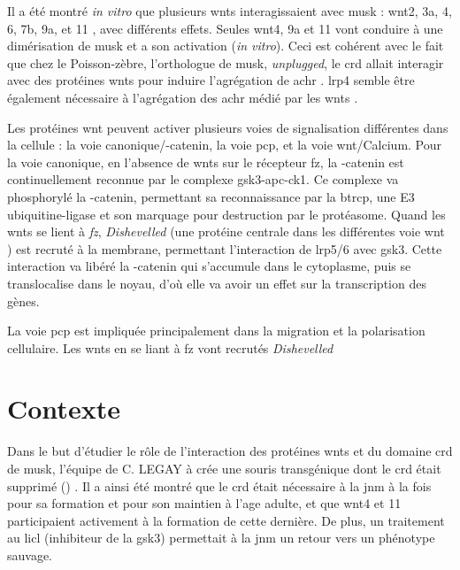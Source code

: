 	Il a été montré \emph{in vitro} que plusieurs \Glspl{wnt} interagissaient avec \gls{musk} : \Gls{wnt}2, 3a, 4, 6, 7b, 9a, et 11 \cite{Strochlic2012, Zhang2012, Barik2014}, avec différents effets. Seules \gls{wnt}4, 9a et 11 vont conduire à une dimérisation de \gls{musk} et a son activation (\emph{in vitro}). Ceci est cohérent avec le fait que chez le Poisson-zèbre, l'orthologue de \gls{musk}, \emph{unplugged}, le \gls{crd} allait interagir avec des protéines \Glspl{wnt} pour induire l'agrégation de \gls{achr} \cite{Jing2009, Gordon2012}. \Gls{lrp}4 semble être également nécessaire à l'agrégation des \gls{achr} médié par les \gls{wnt}s \cite{Zhang2012}.
	
	Les protéines \gls{wnt} peuvent activer plusieurs voies de signalisation différentes dans la cellule :  la voie canonique/\textbeta{}-catenin, la voie \gls{pcp}, et la voie \gls{wnt}/Calcium. Pour la voie canonique, en l'absence de \Glspl{wnt} sur le récepteur \gls{fz}, la \textbeta{}-catenin est continuellement reconnue par le complexe \acrshort{gsk3}-\acrshort{apc}-\acrshort{ck1}. Ce complexe va phosphorylé la \textbeta{}-catenin, permettant sa reconnaissance par la \gls{btrcp}, une E3 ubiquitine-ligase et son marquage pour destruction par le protéasome. Quand les \Glspl{wnt} se lient à \emph{\gls{fz}}, \emph{Dishevelled} (une protéine centrale dans les différentes voie \gls{wnt} \cite{Gao2010}) est recruté à la membrane, permettant l'interaction de \gls{lrp}5/6 avec \gls{gsk3}. Cette interaction va libéré la \textbeta{}-catenin qui s'accumule dans le cytoplasme, puis se translocalise dans le noyau, d'où elle va avoir un effet sur la transcription des gènes. 
	
	La voie \gls{pcp} est impliquée principalement dans la migration et la polarisation cellulaire. Les \Glspl{wnt} en se liant à \gls{fz} vont recrutés \emph{Dishevelled} 

	
\section{Contexte}
	\label{sec:Contexte}
	
	Dans le but d'étudier le rôle de l'interaction des protéines \Glspl{wnt} et du domaine \gls{crd} de \gls{musk}, l'équipe de C. LEGAY à crée une souris transgénique dont le \gls{crd} était supprimé (\mcrd) \cite{Messeant2015, Messeant2017}. Il a ainsi été montré que le \gls{crd} était nécessaire à la \gls{jnm} à la fois pour sa formation et pour son maintien à l'age adulte, et que \Gls{wnt}4 et 11 participaient activement à la formation de cette dernière. De plus, un traitement au \gls{licl} (inhibiteur de la \gls{gsk3}) permettait à la \gls{jnm} un retour vers un phénotype sauvage. 
	
